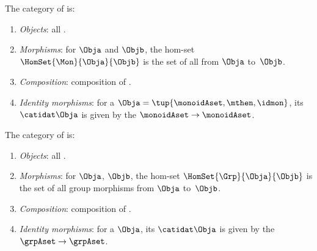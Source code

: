 \begin{ctdefinition}
    \label{def:Mon}
    The category \Mon of  is:
    \begin{enumerate}
        \item \emph{Objects}: all .
        \item \emph{Morphisms}: for  $\Obja$ and $\Objb$, %
              the hom-set $\HomSet{\Mon}{\Obja}{\Objb}$ is the set of all  from $\Obja$ to~$\Objb$.
        \item \emph{Composition}: composition of .
        \item \emph{Identity morphisms}: for a  $\Obja = \tup{\monoidAset, {{\mthen}}, \idmon}$, its  $\catidat\Obja$ is given by the  $\monoidAset \to \monoidAset$.
    \end{enumerate}
\end{ctdefinition}

\begin{ctdefinition}
    \label{def:Grp}
    The category \Grp of  is:
    \begin{enumerate}
        \item \emph{Objects}: all .
        \item \emph{Morphisms}: for  $\Obja$, $\Objb$, %
              the hom-set $\HomSet{\Grp}{\Obja}{\Objb}$ is the set of all group morphisms from $\Obja$ to~$\Objb$.
        \item \emph{Composition}: composition of .
        \item \emph{Identity morphisms}: for a  $\Obja$, its  $\catidat\Obja$ is given by the  $\grpAset \to \grpAset$.
    \end{enumerate}
\end{ctdefinition}
